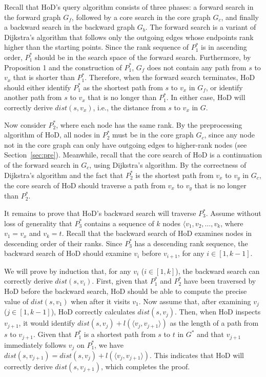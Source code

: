 \documentclass{sig-alternate}
\def\G{G^*}
\def\GC{G_c}
\def\d{dist}
\def\GF{G_f}
\def\GB{G_b}
\begin{document}
\begin{sloppy}
Recall that HoD's query algorithm consists of three phases: a forward search in the forward graph $\GF$, followed by a core search in the core graph $\GC$, and finally a backward search in the backward graph $\GB$. The forward search is a variant of Dijkstra's algorithm that follows only the outgoing edges whose endpoints rank higher than the starting points. Since the rank sequence of $P_1^*$ is in ascending order, $P_1^*$ should be in the search space of the forward search. Furthermore, by Proposition 1 and the construction of $P_1^*$, $\GF$ does not contain any path from $s$ to $v_x$ that is shorter than $P_1^*$. Therefore, when the forward search terminates, HoD should either identify $P_1^*$ as the shortest path from $s$ to $v_x$ in $\GF$, or identify another path from $s$ to $v_x$ that is no longer than $P_1^*$. In either case, HoD will correctly derive $dist(s, v_x)$, i.e., the distance from $s$ to $v_x$ in $G$.

Now consider $P_2^*$, where each node has the same rank. By the preprocessing algorithm of HoD, all nodes in $P_2^*$ must be in the core graph $\GC$, since any node not in the core graph can only have outgoing edges to higher-rank nodes (see Section~\ref{sec:pre}). Meanwhile, recall that the core search of HoD is a continuation of the forward search in $\GC$, using Dijkstra's algorithm. By the correctness of Dijkstra's algorithm and the fact that $P_2^*$ is the shortest path from $v_x$ to $v_y$ in $\GC$, the core search of HoD should traverse a path from $v_x$ to $v_y$ that is no longer than $P_2^*$.

It remains to prove that HoD's backward search will traverse $P_3^*$. Assume without loss of generality that $P_3^*$ contains a sequence of $k$ nodes $\langle v_1, v_2, \ldots, v_k$, where $v_1 = v_x$ and $v_k = t$. Recall that the backward search of HoD examines nodes in descending order of their ranks. Since $P_3^*$ has a descending rank sequence, the backward search of HoD should examine $v_i$ before $v_{i+1}$, for any $i \in [1, k-1]$.

We will prove by induction that, for any $v_i$ ($i \in [1, k]$), the backward search can correctly derive $dist(s, v_i)$. First, given that $P_1^*$ and $P_2^*$ have been traversed by HoD before the backward search, HoD should be able to compute the precise value of $\d(s, v_1)$ when after it visits $v_1$. Now assume that, after examining $v_j$ ($j \in [1, k-1]$), HoD correctly calculates $\d(s, v_j)$. Then, when HoD inspects $v_{j+1}$, it would identify $dist(s, v_j) + l(\langle v_j, v_{j+1}\rangle)$ as the length of a path from $s$ to $v_{j+1}$. Given that $P_1^*$ is a shortest path from $s$ to $t$ in $\G$ and that $v_{j+1}$ immediately follows $v_j$ on $P_1^*$, we have $dist(s, v_{j+1}) = dist(s, v_j) + l(\langle v_j, v_{j+1}\rangle)$. This indicates that HoD will correctly derive $dist(s, v_{j+1})$, which completes the proof.




\end{sloppy}
\end{document}
